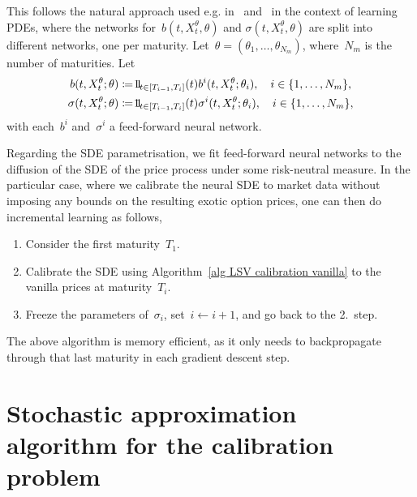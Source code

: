 This follows the natural approach used e.g. in~\cite{Cuchiero2020AModels} and~\cite{Vidales2018UnbiasedPDEs} in the context of learning PDEs, where the networks for~$b(t,X_t^{\theta},\theta)$ and 
$\sigma(t,X_t^{\theta},\theta)$ are split into different networks, one
per maturity.
Let~$\theta=(\theta_1,\ldots,\theta_{N_{m}})$, where~$N_m$ is the number of maturities. 
Let 
\begin{equation} 
\label{eq one network per maturity}
\begin{split}
b(t,X_t^{\theta};\theta) & \defEqual  \ind_{t\in[T_{i-1},T_i]}(t)b^i(t,X_t^{\theta};\theta_i), \quad i\in\{1,\ldots,N_{m}\},	\\
\sigma(t,X_t^{\theta};\theta) & \defEqual  \ind_{t\in[T_{i-1},T_i]}(t)\sigma^i(t,X_t^{\theta};\theta_i), \quad i\in\{1,\ldots,N_{m}\},	
\end{split}
\end{equation}
with each~$b^i$ and~$\sigma^i$ a feed-forward neural network. 

\begin{samepage}
Regarding the SDE parametrisation, we fit feed-forward neural networks to the diffusion of the SDE of the price process under some risk-neutral measure. In the particular case, where we calibrate the neural SDE to market data without imposing any bounds on the resulting exotic option prices, one can then do incremental learning as follows,
\begin{enumerate}
	\item Consider the first maturity~$T_1$.
	\item Calibrate the SDE using Algorithm~\ref{alg LSV calibration vanilla} to the vanilla prices at maturity~$T_i$.
	\item Freeze the parameters of~$\sigma_{i}$, set~$i \leftarrow i+1$,
	and go back to the 2.~step.  
\end{enumerate}
\nopagebreak
The above algorithm is memory efficient, as it only needs to backpropagate through that last maturity in each gradient descent step.  
\end{samepage}


\section{Stochastic approximation algorithm for the calibration problem}\label{sec:sgd}


